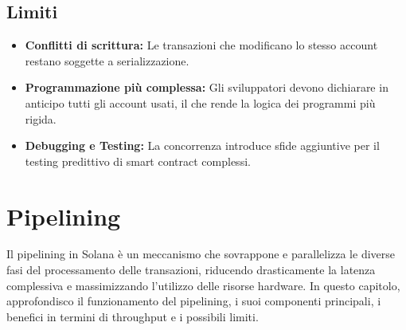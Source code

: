 \documentclass[a4paper,12pt]{report}
\begin{document}
	\subsection{Limiti}
	\begin{itemize}
		\item \textbf{Conflitti di scrittura:} Le transazioni che modificano lo stesso account restano soggette a serializzazione.
		\item \textbf{Programmazione più complessa:} Gli sviluppatori devono dichiarare in anticipo tutti gli account usati, il che rende la logica dei programmi più rigida.
		\item \textbf{Debugging e Testing:} La concorrenza introduce sfide aggiuntive per il testing predittivo di smart contract complessi.
	\end{itemize}
	
	\section{Pipelining}
	
	Il pipelining in Solana è un meccanismo che sovrappone e parallelizza le diverse fasi del processamento delle transazioni, riducendo drasticamente la latenza complessiva e massimizzando l’utilizzo delle risorse hardware. In questo capitolo, approfondisco il funzionamento del pipelining, i suoi componenti principali, i benefici in termini di throughput e i possibili limiti.
	
\end{document}
